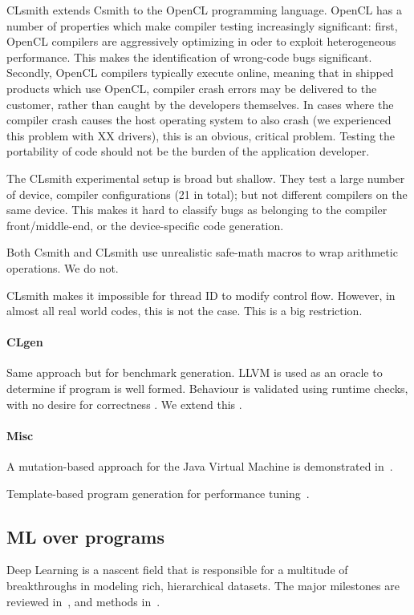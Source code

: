 CLsmith extends Csmith to the OpenCL programming language. OpenCL has a number of properties which make compiler testing increasingly significant: first, OpenCL compilers are aggressively optimizing in oder to exploit heterogeneous performance. This makes the identification of wrong-code bugs significant. Secondly, OpenCL compilers typically execute online, meaning that in shipped products which use OpenCL, compiler crash errors may be delivered to the customer, rather than caught by the developers themselves. In cases where the compiler crash causes the host operating system to also crash (we experienced this problem with XX drivers), this is an obvious, critical problem. Testing the portability of code should not be the burden of the application developer.

The CLsmith experimental setup is broad but shallow. They test a large number of device, compiler configurations (21 in total); but not different compilers on the same device. This makes it hard to classify bugs as belonging to the compiler front/middle-end, or the device-specific code generation.

Both Csmith and CLsmith use unrealistic safe-math macros to wrap arithmetic operations. We do not.

CLsmith makes it impossible for thread ID to modify control flow. However, in almost all real world codes, this is not the case. This is a big restriction.

\paragraph{CLgen} Same approach but for benchmark generation. LLVM is used as an oracle to determine if program is well formed. Behaviour is validated using runtime checks, with no desire for correctness \cite{Cummins2017a}. We extend this \cc{\ldots}.

\paragraph{Misc} A mutation-based approach for the Java Virtual Machine is demonstrated in~\cite{Chena}.

Template-based program generation for performance tuning~\cite{Han2017}.

\subsection{ML over programs} 

Deep Learning is a nascent field that is responsible for a multitude of breakthroughs in modeling rich, hierarchical datasets. The major milestones are reviewed in~\cite{Wang2017}, and methods in~\cite{Schmidhuber2014}.


